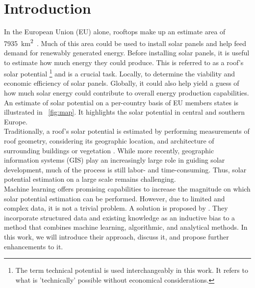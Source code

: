 \documentclass{article} %
\newcommand{\figref}[1]{\figurename~\ref{#1}}
\begin{document}
\section*{Introduction}
In the European Union (EU) alone, rooftops make up an estimate area of \SI{7935}{\kilo\metre\squared}~\cite{bodis2019high}. Much of this area could be used to install solar panels and help feed demand for renewably generated energy. Before installing solar panels, it is useful to estimate how much energy they could produce. This is referred to as a roof's solar potential \footnote{The term technical potential is used interchangeably in this work. It refers to what is 'technically' possible without economical considerations.} and is a crucial task. Locally, to determine the viability and economic efficiency of solar panels. Globally, it could also help yield a guess of how much solar energy could contribute to overall energy production capabilities. An estimate of solar potential on a per-country basis of EU members states is illustrated in \figref{fig:map}. It highlights the solar potential in central and southern Europe.\\
Traditionally, a roof's solar potential is estimated by performing measurements of roof geometry, considering its geographic location, and architecture of surrounding buildings or vegetation \cite{freitas2015modelling}. While more recently, geographic information systems (GIS) play an increasingly large role in guiding solar development, much of the process is still labor- and time-consuming. Thus, solar potential estimation on a large scale remains challenging.\\
Machine learning offers promising capabilities to increase the magnitude on which solar potential estimation can be performed. However, due to limited and complex data, it is not a trivial problem. A solution is proposed by \citet{de2021predicting}. They incorporate structured data and existing knowledge as an inductive bias to a method that combines machine learning, algorithmic, and analytical methods. In this work, we will introduce their approach, discuss it, and propose further enhancements to it.
\end{document}
